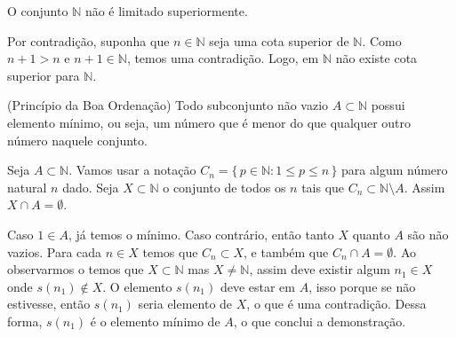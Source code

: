 \documentclass[../main.tex]{subfiles}
\begin{document}
\begin{teo}\label{nat-teo-ilimitadoSuperiormente}
    O conjunto $\mathbb{N}$ não é limitado superiormente.
\end{teo}
\begin{dem}
    Por contradição, suponha que $n \in \mathbb{N}$ seja uma cota superior de $\mathbb{N}$. Como $n+1 > n$ e $n+1 \in \mathbb{N}$, temos uma contradição. Logo, em $\mathbb{N}$ não existe cota superior para $\mathbb{N}$.
\end{dem}
\begin{teo}\label{nat-teo-PBO}(Princípio da Boa Ordenação)
    Todo subconjunto não vazio $A \subset \mathbb{N}$ possui elemento mínimo, ou seja, um número que é menor do que qualquer outro número naquele conjunto.
\end{teo}
\begin{dem}
    Seja $A \subset \mathbb{N}$. Vamos usar a notação $C_n = \{\,p \in \mathbb{N} : 1 \leq p \leq n \,\}$ para algum número natural $n$ dado. Seja $X \subset \mathbb{N}$ o conjunto de todos os $n$ tais que $C_n \subset \mathbb{N} \setminus A$. Assim $X \cap A = \emptyset$.

    Caso $1 \in A$, já temos o mínimo. Caso contrário, então tanto $X$ quanto $A$ são não vazios. Para cada $n \in X$ temos que $C_n \subset X$, e também que $C_n \cap A = \emptyset$. Ao observarmos o  temos que $X \subset \mathbb{N}$ mas $X \neq \mathbb{N}$, assim deve existir algum $n_1 \in X$ onde $s(n_1) \not\in X$. O elemento $s(n_1)$ deve estar em $A$, isso porque se não estivesse, então $s(n_1)$ seria elemento de $X$, o que é uma contradição. Dessa forma, $s(n_1)$ é o elemento mínimo de $A$, o que conclui a demonstração.
\end{dem}
\end{document}
